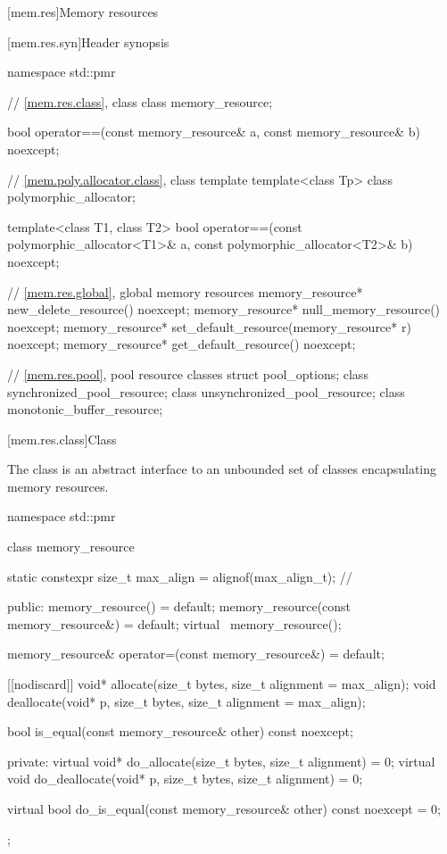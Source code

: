 [mem.res]{Memory resources}

[mem.res.syn]{Header  synopsis}

%
\begin{codeblock}
namespace std::pmr {
  // \ref{mem.res.class}, class 
  class memory_resource;

  bool operator==(const memory_resource& a, const memory_resource& b) noexcept;

  // \ref{mem.poly.allocator.class}, class template 
  template<class Tp> class polymorphic_allocator;

  template<class T1, class T2>
    bool operator==(const polymorphic_allocator<T1>& a,
                    const polymorphic_allocator<T2>& b) noexcept;

  // \ref{mem.res.global}, global memory resources
  memory_resource* new_delete_resource() noexcept;
  memory_resource* null_memory_resource() noexcept;
  memory_resource* set_default_resource(memory_resource* r) noexcept;
  memory_resource* get_default_resource() noexcept;

  // \ref{mem.res.pool}, pool resource classes
  struct pool_options;
  class synchronized_pool_resource;
  class unsynchronized_pool_resource;
  class monotonic_buffer_resource;
}
\end{codeblock}

[mem.res.class]{Class }

\pnum
The  class is an abstract interface to an unbounded set of classes encapsulating memory resources.

%
%
\begin{codeblock}
namespace std::pmr {
  class memory_resource {
    static constexpr size_t max_align = alignof(max_align_t);   // \expos

  public:
    memory_resource() = default;
    memory_resource(const memory_resource&) = default;
    virtual ~memory_resource();

    memory_resource& operator=(const memory_resource&) = default;

    [[nodiscard]] void* allocate(size_t bytes, size_t alignment = max_align);
    void deallocate(void* p, size_t bytes, size_t alignment = max_align);

    bool is_equal(const memory_resource& other) const noexcept;

  private:
    virtual void* do_allocate(size_t bytes, size_t alignment) = 0;
    virtual void do_deallocate(void* p, size_t bytes, size_t alignment) = 0;

    virtual bool do_is_equal(const memory_resource& other) const noexcept = 0;
  };
}
\end{codeblock}


